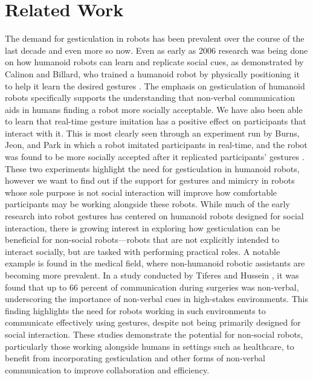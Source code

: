 \documentclass[conference]{IEEEtran}
\begin{document}
\section{Related Work}
The demand for gesticulation in robots has been prevalent over the course of the last decade and even more so now. Even as early as 2006 research was being done on how humanoid robots can learn and replicate social cues, as demonstrated by Calinon and Billard, who trained a humanoid robot by physically positioning it to help it learn the desired gestures \cite{10.1145/1228716.1228751}. The emphasis on gesticulation of humanoid robots specifically supports the understanding that non-verbal communication aids in humans finding a robot more socially acceptable. We have also been able to learn that real-time gesture imitation has a positive effect on participants that interact with it. This is most clearly seen through an experiment run by Burns, Jeon, and Park in which a robot imitated participants in real-time, and the robot was found to be more socially accepted after it replicated participants' gestures \cite{app8020241}. These two experiments highlight the need for gesticulation in humanoid robots, however we want to find out if the support for gestures and mimicry in robots whose sole purpose is not social interaction will improve how comfortable participants may be working alongside these robots. While much of the early research into robot gestures has centered on humanoid robots designed for social interaction, there is growing interest in exploring how gesticulation can be beneficial for non-social robots—robots that are not explicitly intended to interact socially, but are tasked with performing practical roles. A notable example is found in the medical field, where non-humanoid robotic assistants are becoming more prevalent. In a study conducted by Tiferes and Hussein \cite{article}, it was found that up to 66 percent of communication during surgeries was non-verbal, underscoring the importance of non-verbal cues in high-stakes environments. This finding highlights the need for robots working in such environments to communicate effectively using gestures, despite not being primarily designed for social interaction. These studies demonstrate the potential for non-social robots, particularly those working alongside humans in settings such as healthcare, to benefit from incorporating gesticulation and other forms of non-verbal communication to improve collaboration and efficiency.
\end{document}
